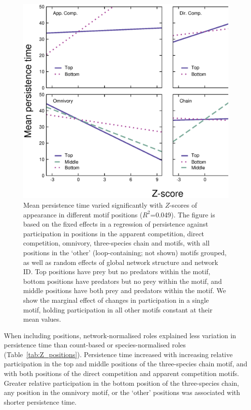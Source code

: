 \documentclass[12pt]{article}
\begin{document}
        \begin{figure}[ht!]
            \centering
            \includegraphics[width=.75\textwidth]{figures/roles/persistence_vs_positions_Z.eps}
            \caption{Mean persistence time varied significantly with $Z$-scores of appearance in different motif positions ($R^2$=0.049). The figure is based on the fixed effects in a regression of persistence against participation in positions in the apparent competition, direct competition, omnivory, three-species chain and motifs, with all positions in the `other' (loop-containing; not shown) motifs grouped, as well as random effects of global network structure and network ID. Top positions have prey but no predators within the motif, bottom positions have predators but no prey within the motif, and middle positions have both prey and predators within the motif. We show the marginal effect of changes in participation in a single motif, holding participation in all other motifs constant at their mean values.}
            \label{fig:persistence_positions_Z}
        \end{figure}

        When including positions, network-normalised roles explained less variation in persistence time than count-based or species-normalised roles (Table~\ref{tab:Z_positions}).
        Persistence time increased with increasing relative participation in the top and middle positions of the three-species chain motif, and with both positions of the direct competition and apparent competition motifs.
        Greater relative participation in the bottom position of the three-species chain, any position in the omnivory motif, or the `other' positions was associated with shorter persistence time.
        
\end{document}
